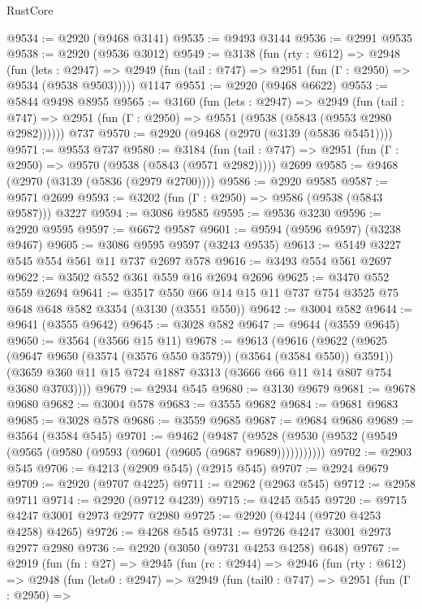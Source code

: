 \begin{lexlean}{RustCore}
\begin{coremodule}
@9534 := @2920 (@9468 @3141)
@9535 := @9493 @3144
@9536 := @2991 @9535
@9538 := @2920 (@9536 @3012)
@9549 := @3138
    (fun (rty : @612) =>
    @2948
      (fun (lets : @2947) =>
      @2949 (fun (tail : @747) => @2951 (fun (Γ : @2950) => @9534 (@9538 @9503)))))
    @1147
@9551 := @2920 (@9468 @6622)
@9553 := @5844 @9498 @8955
@9565 := @3160
    (fun (lets : @2947) =>
    @2949
      (fun (tail : @747) => @2951 (fun (Γ : @2950) => @9551 (@9538 (@5843 (@9553 @2980 @2982))))))
    @737
@9570 := @2920 (@9468 (@2970 (@3139 (@5836 @5451))))
@9571 := @9553 @737
@9580 := @3184
    (fun (tail : @747) => @2951 (fun (Γ : @2950) => @9570 (@9538 (@5843 (@9571 @2982)))))
    @2699
@9585 := @9468 (@2970 (@3139 (@5836 (@2979 @2700))))
@9586 := @2920 @9585
@9587 := @9571 @2699
@9593 := @3202 (fun (Γ : @2950) => @9586 (@9538 (@5843 @9587))) @3227
@9594 := @3086 @9585
@9595 := @9536 @3230
@9596 := @2920 @9595
@9597 := @6672 @9587
@9601 := @9594 (@9596 @9597) (@3238 @9467)
@9605 := @3086 @9595 @9597 (@3243 @9535)
@9613 := @5149 @3227 @545 @554 @561 @11 @737 @2697 @578
@9616 := @3493 @554 @561 @2697
@9622 := @3502 @552 @361 @559 @16 @2694 @2696
@9625 := @3470 @552 @559 @2694
@9641 := @3517 @550 @66 @14 @15 @11 @737 @754 @3525 @75 @648 @648 @582 @3354 (@3130 (@3551 @550))
@9642 := @3004 @582
@9644 := @9641 (@3555 @9642)
@9645 := @3028 @582
@9647 := @9644 (@3559 @9645)
@9650 := @3564 (@3566 @15 @11)
@9678 := @9613
    (@9616
      (@9622
        (@9625 (@9647 @9650 (@3574 (@3576 @550 @3579)) (@3564 (@3584 @550)) @3591))
        (@3659 @360 @11 @15 @724 @1887 @3313 (@3666 @66 @11 @14 @807 @754 @3680 @3703))))
@9679 := @2934 @545
@9680 := @3130 @9679
@9681 := @9678 @9680
@9682 := @3004 @578
@9683 := @3555 @9682
@9684 := @9681 @9683
@9685 := @3028 @578
@9686 := @3559 @9685
@9687 := @9684 @9686
@9689 := @3564 (@3584 @545)
@9701 := @9462
    (@9487 (@9528 (@9530 (@9532 (@9549 (@9565 (@9580 (@9593 (@9601 (@9605 (@9687 @9689)))))))))))
@9702 := @2903 @545
@9706 := @4213 (@2909 @545) (@2915 @545)
@9707 := @2924 @9679
@9709 := @2920 (@9707 @4225)
@9711 := @2962 (@2963 @545)
@9712 := @2958 @9711
@9714 := @2920 (@9712 @4239)
@9715 := @4245 @545
@9720 := @9715 @4247 @3001 @2973 @2977 @2980
@9725 := @2920 (@4244 (@9720 @4253 @4258) @4265)
@9726 := @4268 @545
@9731 := @9726 @4247 @3001 @2973 @2977 @2980
@9736 := @2920 (@3050 (@9731 @4253 @4258) @648)
@9767 := @2919
    (fun (fn : @27) =>
    @2945
      (fun (rc : @2944) =>
      @2946
        (fun (rty : @612) =>
        @2948
          (fun (lets0 : @2947) =>
          @2949
            (fun (tail0 : @747) =>
            @2951
              (fun (Γ : @2950) =>

\end{coremodule}
\end{lexlean}
